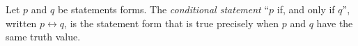 \guard



\begin{defn}
\label{defs:biconditional}
  Let $p$ and $q$ be statements forms.
  The \emph{conditional statement} ``$p$ if, and only if $q$'', written $p \leftrightarrow q$, is the statement form that is true precisely when $p$ and $q$ have the same truth value.
\end{defn}
